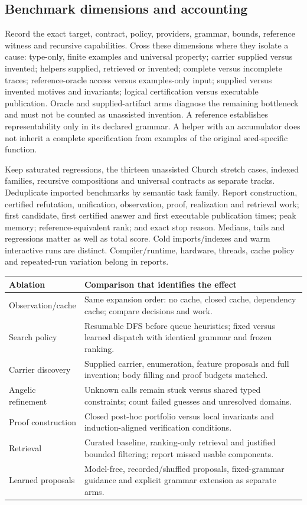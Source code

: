 \subsection{Benchmark dimensions and accounting}

Record the exact target, contract, policy, providers, grammar, bounds, reference
witness and recursive capabilities. Cross these dimensions where they isolate
a cause: type-only, finite examples and universal property; carrier supplied
versus invented; helpers supplied, retrieved or invented; complete versus
incomplete traces; reference-oracle access versus examples-only input;
supplied versus invented motives and invariants; logical certification versus
executable publication. Oracle and supplied-artifact arms diagnose the
remaining bottleneck and must not be counted as unassisted invention. A
reference establishes representability only in its declared grammar. A helper
with an accumulator does not inherit a complete specification from examples
of the original seed-specific function.

Keep saturated regressions, the thirteen unassisted Church stretch cases,
indexed families, recursive compositions and universal contracts as separate
tracks. Deduplicate imported benchmarks by semantic task family. Report
construction, certified refutation, unification, observation, proof, realization
and retrieval work; first candidate, first certified answer and first executable
publication times; peak memory; reference-equivalent rank; and exact stop
reason. Medians, tails and regressions matter as well as total score. Cold
imports/indexes and warm interactive runs are distinct. Compiler/runtime,
hardware, threads, cache policy and repeated-run variation belong in reports.

\begin{longtable}{@{}L{39mm}L{109mm}@{}}
\toprule Ablation & Comparison that identifies the effect\\\midrule\endhead
Observation/cache & Same expansion order: no cache, closed cache, dependency cache; compare decisions and work.\\
Search policy & Resumable DFS before queue heuristics; fixed versus learned dispatch with identical grammar and frozen ranking.\\
Carrier discovery & Supplied carrier, enumeration, feature proposals and full invention; body filling and proof budgets matched.\\
Angelic refinement & Unknown calls remain stuck versus shared typed constraints; count failed guesses and unresolved domains.\\
Proof construction & Closed post-hoc portfolio versus local invariants and induction-aligned verification conditions.\\
Retrieval & Curated baseline, ranking-only retrieval and justified bounded filtering; report missed usable components.\\
Learned proposals & Model-free, recorded/shuffled proposals, fixed-grammar guidance and explicit grammar extension as separate arms.\\
\bottomrule
\end{longtable}

